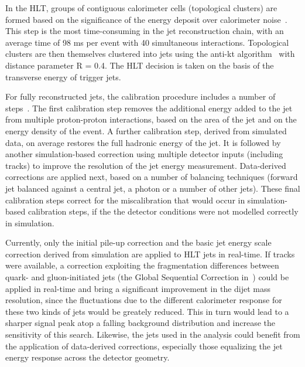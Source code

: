 \documentclass[a4paper,justified]{tufte-handout}
\begin{document}
In the HLT, groups of contiguous calorimeter cells (topological clusters) are formed based on the significance of the energy deposit over calorimeter noise~\cite{Aad:2016upy}. This step is the most time-consuming in the jet reconstruction chain, with an average time of 98 ms per event with 40 simultaneous interactions. Topological clusters are then themselves clustered into jets using the anti-kt algorithm~\cite{Cacciari:2008gp,Cacciari:2006} with distance parameter R = 0.4. The HLT decision is taken on the basis of the transverse energy of trigger jets. 

For fully reconstructed jets, the calibration procedure includes a number of steps~\cite{Aaboud:2017jcu}. The first calibration step removes the additional energy added to the jet from multiple proton-proton interactions, based on the area of the jet and on the energy density of the event. A further calibration step, derived from simulated data, on average restores the full hadronic energy of the jet. It is followed by another simulation-based correction using multiple detector inputs (including tracks) to improve the resolution of the jet energy measurement. Data-derived corrections are applied next, based on a number of balancing techniques (forward jet balanced against a central jet, a photon or a number of other jets). These final calibration steps correct for the miscalibration that would occur in simulation-based calibration steps, if the the detector conditions were not modelled correctly in simulation. 

Currently, only  the initial pile-up correction and the basic jet energy scale correction derived from simulation are applied to HLT jets in real-time. If tracks were available, a correction exploiting the fragmentation differences between quark- and gluon-initiated jets (the Global Sequential Correction in~\cite{ATLAS-CONF-2015-002}) could  be applied in real-time and bring a significant improvement in the dijet mass resolution, since the fluctuations due to the different calorimeter response for these two kinds of jets would be greately reduced. This in turn would lead to a sharper signal peak atop a falling background distribution and increase the sensitivity of this search. Likewise, the jets used in the analysis could benefit from the application of data-derived corrections, especially those equalizing the jet energy response across the detector geometry. 
\end{document}
